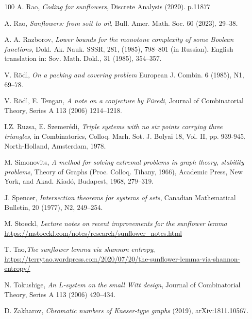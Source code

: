 \documentclass[graybox]{svmult}
\begin{document}
\begin{thebibliography}{100}
 A. Rao, {\it Coding for sunflowers}, Discrete Analysis (2020). p.11877

 A. Rao, {\it Sunflowers: from soit to oil}, Bull. Amer. Math. Soc. 60 (2023), 29--38.

  A. A. Razborov, {\it Lower bounds for the monotone complexity of some Boolean functions}, Dokl.
Ak. Nauk. SSSR, 281, (1985), 798--801 (in Russian). English translation in: Sov. Math. Dokl., 31 (1985), 354--357. 

 V. R\"odl, {\it On a packing and covering problem} European J. Combin. 6 (1985), N1, 69--78.

 V. R\" odl, E. Tengan, {\it A note on a conjecture by F\"uredi}, Journal of Combinatorial Theory, Series A 113 (2006) 1214--1218.

 I.Z. Ruzsa, E. Szemer\'edi, {\it Triple systems with no six points carrying three triangles}, in Combinatorics, Colloq. Marh. Sot. J. Bolyai 18, Vol. II, pp. 939-945, North-Holland, Amsterdam, 1978.

 M. Simonovits, {\it A method for solving extremal problems in graph theory, stability problems}, Theory of Graphs (Proc. Colloq. Tihany, 1966), Academic Press, New York, and Akad. Kiad\'o, Budapest, 1968, 279–319.

 J. Spencer, {\it Intersection theorems for systems of sets}, Canadian Mathematical Bulletin, 20 (1977), N2, 249--254.

 M. Stoeckl, {\it Lecture notes on recent improvements for the sunflower lemma}
\url{https://mstoeckl.com/notes/research/sunflower_notes.html }


 T. Tao,{\it The sunflower lemma via shannon entropy}, \url{https://terrytao.wordpress.com/2020/07/20/the-sunflower-lemma-via-shannon-entropy/}


 N. Tokushige, {\it An $L$-system on the small Witt design}, Journal of Combinatorial Theory, Series A 113 (2006) 420--434.


 D. Zakharov, {\it Chromatic numbers of Kneser-type graphs} (2019), arXiv:1811.10567.













\end{thebibliography}
\end{document}
